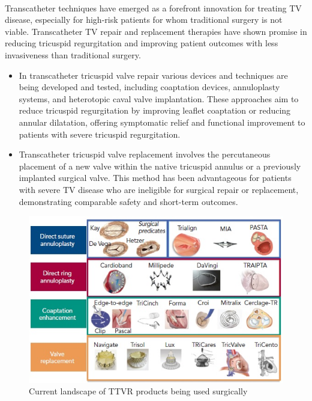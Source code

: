 \\
Transcatheter techniques have emerged as a forefront innovation for treating \gls{TV} disease, especially for high-risk patients for whom traditional surgery is not viable. Transcatheter \gls{TV} repair and replacement therapies have shown promise in reducing tricuspid regurgitation and improving patient outcomes with less invasiveness than traditional surgery.
\begin{itemize}
    \item In transcatheter tricuspid valve repair various devices and techniques are being developed and tested, including coaptation devices, annuloplasty systems, and heterotopic caval valve implantation. These approaches aim to reduce tricuspid regurgitation by improving leaflet coaptation or reducing annular dilatation, offering symptomatic relief and functional improvement to patients with severe tricuspid regurgitation. ~

    \item Transcatheter tricuspid valve replacement involves the percutaneous placement of a new valve within the native tricuspid annulus or a previously implanted surgical valve. This method has been advantageous for patients with severe \gls{TV} disease who are ineligible for surgical repair or replacement, demonstrating comparable safety and short-term outcomes. ~
\end{itemize}
\begin{figure}[H]
    \centering
    \includegraphics[width=\linewidth]{figures/TTVR.jpg}
    \caption{Current landscape of \gls{TTVR} products being used surgically ~}
    \label{fig:TTVR}
\end{figure}

